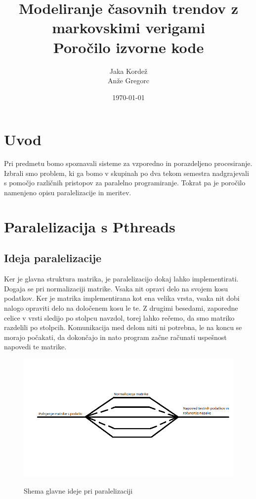\documentclass[a4paper,11pt]{article}
\title{Modeliranje časovnih trendov z markovskimi verigami \\ \large  Poročilo izvorne kode}
\author{Jaka Kordež \\ Anže Gregorc}
\date{\today}
\begin{document}
\maketitle

\tableofcontents

\section{Uvod}

Pri predmetu bomo spoznavali sisteme za vzporedno in porazdeljeno procesiranje. Izbrali smo problem, ki ga bomo v skupinah po dva tekom semestra nadgrajevali s pomočjo različnih pristopov za paralelno programiranje. Tokrat pa je poročilo namenjeno opisu paralelizacije in meritev.

\section{Paralelizacija s Pthreads}

\subsection{Ideja paralelizacije}

Ker je glavna struktura matrika, je paralelizacijo dokaj lahko implementirati. Dogaja se pri normalizaciji matrike. Vsaka nit opravi delo na svojem kosu podatkov. Ker je matrika implementirana kot ena velika vrsta, vsaka nit dobi nalogo opraviti delo na določenem kosu le te. Z drugimi besedami, zaporedne celice v vrsti sledijo po stolpcu navzdol, torej lahko rečemo, da smo matriko razdelili po stolpcih. Komunikacija med delom niti ni potrebna, le na koncu se morajo počakati, da dokončajo in nato program začne računati uspešnost napovedi te matrike.


\begin{figure}[H]
\begin{center}
\caption{Shema glavne ideje pri paralelizaciji}
\includegraphics[scale=0.6]{Shema.png}
\label{shema}
\end{center}
\end{figure}
\end{document}
